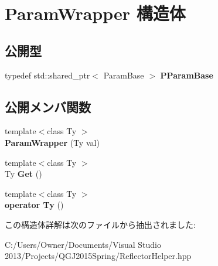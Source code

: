 \hypertarget{struct_param_wrapper}{}\section{Param\+Wrapper 構造体}
\label{struct_param_wrapper}
\subsection*{公開型}
\begin{DoxyCompactItemize}
\item 
typedef std\+::shared\+\_\+ptr$<$ Param\+Base $>$ {\bfseries P\+Param\+Base}\hypertarget{struct_param_wrapper_a63f58e18e7d9f293d3877d7792506c44}{}\label{struct_param_wrapper_a63f58e18e7d9f293d3877d7792506c44}

\end{DoxyCompactItemize}
\subsection*{公開メンバ関数}
\begin{DoxyCompactItemize}
\item 
{\footnotesize template$<$class Ty $>$ }\\{\bfseries Param\+Wrapper} (Ty val)\hypertarget{struct_param_wrapper_af157a91a90255e4571008ccdc6946d3c}{}\label{struct_param_wrapper_af157a91a90255e4571008ccdc6946d3c}

\item 
{\footnotesize template$<$class Ty $>$ }\\Ty {\bfseries Get} ()\hypertarget{struct_param_wrapper_a53939868a7d8d561b3fa23eefbe9cf16}{}\label{struct_param_wrapper_a53939868a7d8d561b3fa23eefbe9cf16}

\item 
{\footnotesize template$<$class Ty $>$ }\\{\bfseries operator Ty} ()\hypertarget{struct_param_wrapper_a6d0eadb0c5d7429a0db5ff4c34c9588c}{}\label{struct_param_wrapper_a6d0eadb0c5d7429a0db5ff4c34c9588c}

\end{DoxyCompactItemize}


この構造体詳解は次のファイルから抽出されました\+:\begin{DoxyCompactItemize}
\item 
C\+:/\+Users/\+Owner/\+Documents/\+Visual Studio 2013/\+Projects/\+Q\+G\+J2015\+Spring/Reflector\+Helper.\+hpp\end{DoxyCompactItemize}
